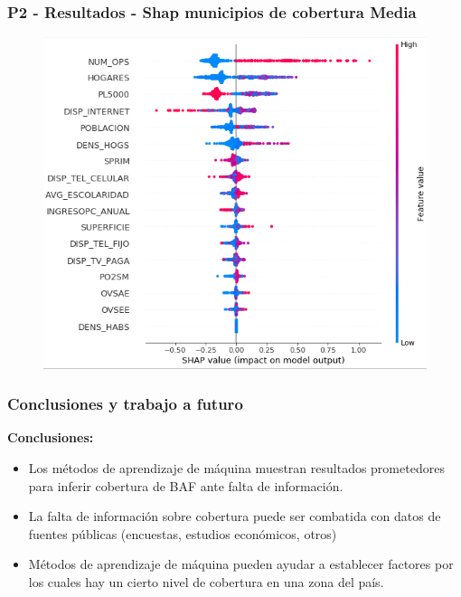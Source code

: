 \documentclass[xcolor=dvipsnames, compress]{beamer}
\begin{document}
\begin{frame}
\frametitle{P2 - Resultados - Shap municipios de cobertura Media}
\begin{figure}
\includegraphics[scale=0.45]{images/p2_results_shap.png}
\end{figure}
\end{frame}


\begin{frame}
\frametitle{Conclusiones y trabajo a futuro}

		\textbf{Conclusiones:}
		\begin{itemize}
			\item Los métodos de aprendizaje de máquina muestran resultados prometedores para inferir cobertura de BAF ante falta de información.
			\item La falta de información sobre cobertura puede ser combatida con datos de fuentes públicas (encuestas, estudios económicos, otros)
			\item Métodos de aprendizaje de máquina pueden ayudar a establecer factores por los cuales hay un cierto nivel de cobertura en una zona del país.

		\end{itemize}

\end{frame}
\end{document}
